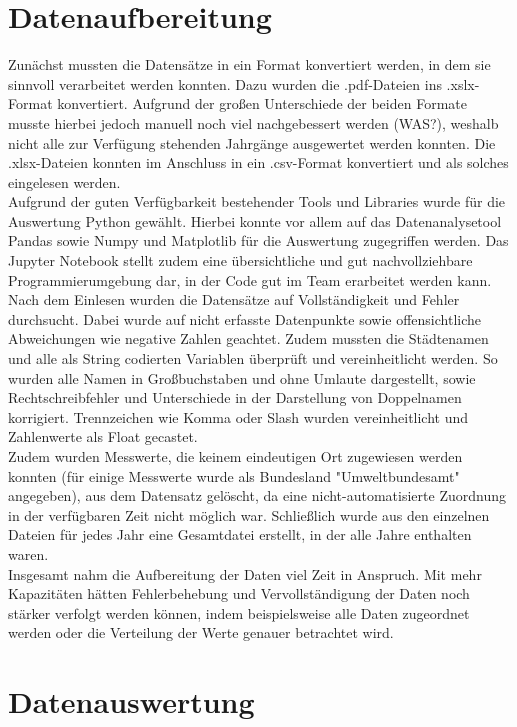 \documentclass[11pt,a4paper,oneside,german]{article}
\begin{document}
\section{Datenaufbereitung}

Zunächst mussten die Datensätze in ein Format konvertiert werden, in dem sie sinnvoll verarbeitet werden konnten. Dazu wurden die .pdf-Dateien ins .xslx-Format konvertiert. Aufgrund der großen Unterschiede der beiden Formate musste hierbei jedoch manuell noch viel nachgebessert werden (WAS?), weshalb nicht alle zur Verfügung stehenden Jahrgänge ausgewertet werden konnten. Die .xlsx-Dateien konnten im Anschluss in ein .csv-Format konvertiert und als solches eingelesen werden.\\
Aufgrund der guten Verfügbarkeit bestehender Tools und Libraries wurde für die Auswertung Python gewählt. Hierbei konnte vor allem auf das Datenanalysetool Pandas sowie Numpy und Matplotlib für die Auswertung zugegriffen werden. Das Jupyter Notebook stellt zudem eine übersichtliche und gut nachvollziehbare Programmierumgebung dar, in der Code gut im Team erarbeitet werden kann.\\
Nach dem Einlesen wurden die Datensätze auf Vollständigkeit und Fehler durchsucht. Dabei wurde auf nicht erfasste Datenpunkte sowie offensichtliche Abweichungen wie negative Zahlen geachtet. Zudem mussten die Städtenamen und alle als String codierten Variablen überprüft und vereinheitlicht werden. So wurden alle Namen in Großbuchstaben und ohne Umlaute dargestellt, sowie Rechtschreibfehler und Unterschiede in der Darstellung von Doppelnamen korrigiert. Trennzeichen wie Komma oder Slash wurden vereinheitlicht und Zahlenwerte als Float gecastet. \\
Zudem wurden Messwerte, die keinem eindeutigen Ort zugewiesen werden konnten (für einige Messwerte wurde als Bundesland "Umweltbundesamt" angegeben), aus dem Datensatz gelöscht, da eine nicht-automatisierte Zuordnung in der verfügbaren Zeit nicht möglich war. Schließlich wurde aus den einzelnen Dateien für jedes Jahr eine Gesamtdatei erstellt, in der alle Jahre enthalten waren. \\
Insgesamt nahm die Aufbereitung der Daten viel Zeit in Anspruch. Mit mehr Kapazitäten hätten Fehlerbehebung und Vervollständigung der Daten noch stärker verfolgt werden können, indem beispielsweise alle Daten zugeordnet werden oder die Verteilung der Werte genauer betrachtet wird.

\section{Datenauswertung}
\end{document}
